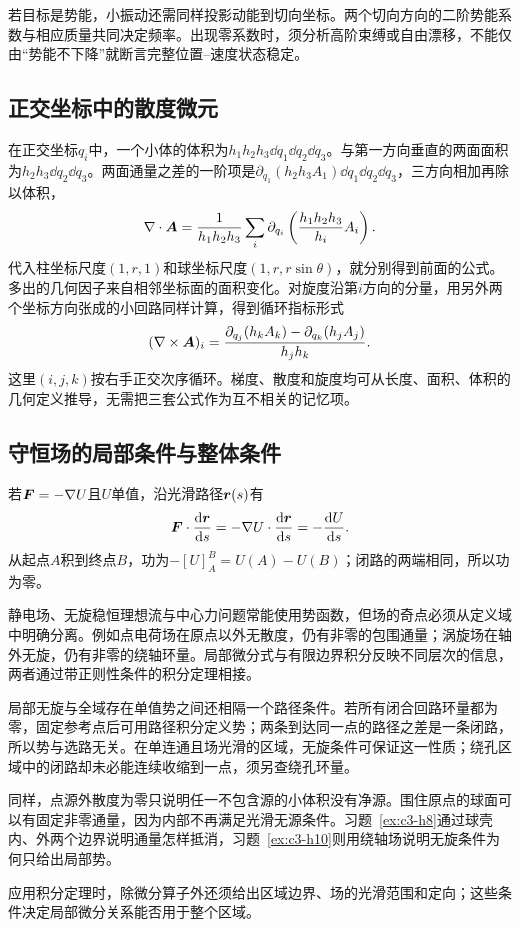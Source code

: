 若目标是势能，小振动还需同样投影动能到切向坐标。两个切向方向的二阶势能系数与相应质量共同决定频率。出现零系数时，须分析高阶束缚或自由漂移，不能仅由“势能不下降”就断言完整位置--速度状态稳定。

\subsection{正交坐标中的散度微元}
在正交坐标$q_i$中，一个小体的体积为$h_1h_2h_3\dd q_1\dd q_2\dd q_3$。与第一方向垂直的两面面积为$h_2h_3\dd q_2\dd q_3$。两面通量之差的一阶项是$\partial_{q_1}(h_2h_3A_1)\dd q_1\dd q_2\dd q_3$，三方向相加再除以体积，
\[\nabla\cdot\bm{A}=\frac1{h_1h_2h_3}\sum_i\partial_{q_i}\left(\frac{h_1h_2h_3}{h_i}A_i\right).
\]
代入柱坐标尺度$(1,r,1)$和球坐标尺度$(1,r,r\sin\theta)$，就分别得到前面的公式。多出的几何因子来自相邻坐标面的面积变化。对旋度沿第$i$方向的分量，用另外两个坐标方向张成的小回路同样计算，得到循环指标形式
\[(\nabla\times\bm{A})_i=\frac{\partial_{q_j}(h_kA_k)-\partial_{q_k}(h_jA_j)}{h_jh_k}.
\]
这里$(i,j,k)$按右手正交次序循环。梯度、散度和旋度均可从长度、面积、体积的几何定义推导，无需把三套公式作为互不相关的记忆项。

\subsection{守恒场的局部条件与整体条件}
若$\bm{F}=-\nabla U$且$U$单值，沿光滑路径$\bm{r}(s)$有
\[\bm{F}\cdot\frac{\mathop{}\!\mathrm d\bm{r}}{\mathop{}\!\mathrm d s}
=-\nabla U\cdot\frac{\mathop{}\!\mathrm d\bm{r}}{\mathop{}\!\mathrm d s}=-\frac{\mathop{}\!\mathrm d U}{\mathop{}\!\mathrm d s}.\]
从起点$A$积到终点$B$，功为$-[U]_A^B=U(A)-U(B)$；闭路的两端相同，所以功为零。

静电场、无旋稳恒理想流与中心力问题常能使用势函数，但场的奇点必须从定义域中明确分离。例如点电荷场在原点以外无散度，仍有非零的包围通量；涡旋场在轴外无旋，仍有非零的绕轴环量。局部微分式与有限边界积分反映不同层次的信息，两者通过带正则性条件的积分定理相接。

局部无旋与全域存在单值势之间还相隔一个路径条件。若所有闭合回路环量都为零，固定参考点后可用路径积分定义势；两条到达同一点的路径之差是一条闭路，所以势与选路无关。在单连通且场光滑的区域，无旋条件可保证这一性质；绕孔区域中的闭路却未必能连续收缩到一点，须另查绕孔环量。

同样，点源外散度为零只说明任一不包含源的小体积没有净源。围住原点的球面可以有固定非零通量，因为内部不再满足光滑无源条件。习题~\ref{ex:c3-h8}通过球壳内、外两个边界说明通量怎样抵消，习题~\ref{ex:c3-h10}则用绕轴场说明无旋条件为何只给出局部势。

应用积分定理时，除微分算子外还须给出区域边界、场的光滑范围和定向；这些条件决定局部微分关系能否用于整个区域。


